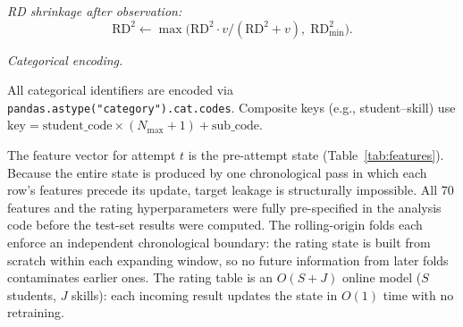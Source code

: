 \documentclass[11pt]{article}
\begin{document}
\medskip\noindent
\textit{RD shrinkage after observation:}
\begin{equation}
\mathrm{RD}^2 \leftarrow \max\!\bigl(\mathrm{RD}^2 \cdot v / (\mathrm{RD}^2 + v),\;\mathrm{RD}_{\min}^2\bigr).
\end{equation}

\medskip\noindent
\textit{Categorical encoding.}\quad
\begin{sloppypar}
All categorical identifiers are encoded via
\texttt{pandas.astype("category").cat.codes}.
Composite keys (e.g., student--skill) use
$\text{key} = \text{student\_code} \times (N_{\max}+1) + \text{sub\_code}$.
\end{sloppypar}

\medskip\noindent
The feature vector for attempt $t$ is the pre-attempt state (Table~\ref{tab:features}).
Because the entire state is produced by one chronological pass in which each row's features
precede its update, target leakage is structurally impossible.
All 70 features and the rating hyperparameters were fully pre-specified in the analysis
code before the test-set results were computed.
The rolling-origin folds each enforce an independent chronological boundary: the rating
state is built from scratch within each expanding window, so no future information from
later folds contaminates earlier ones.
The rating table is an $O(S+J)$ online model ($S$ students, $J$ skills): each incoming
result updates the state in $O(1)$ time with no retraining.
\end{document}
